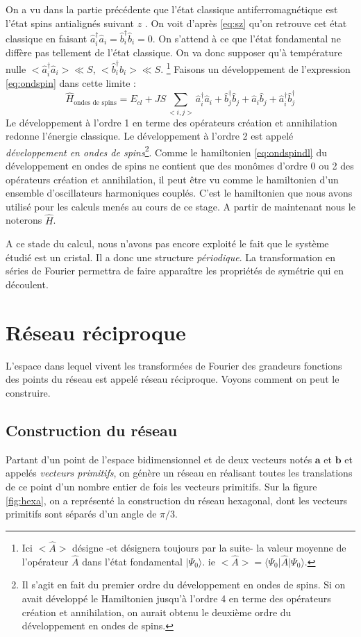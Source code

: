 \documentclass[a4paper, french]{report}
\newcommand{\bra}[1]{\ensuremath{\langle #1|}\xspace}
\newcommand{\an}{\hat{a}}
\newcommand{\cre}{\hat{a}^\dagger}
\newcommand{\h}{\ensuremath{\hat{H}}\xspace}
\newcommand{\ban}{\hat{b}}
\newcommand{\bcre}{\hat{b}^\dagger}
\newcommand{\fond}{\ensuremath{| \Psi_0 \rangle}\xspace}
\newcommand{\1}{\ensuremath{\ket{\om_1\bom_1}}\xspace}
\newcommand{\2}{\ensuremath{\ket{\om_2\bom_2}}\xspace}
\begin{document}
On a vu dans la partie précédente que l'état classique antiferromagnétique est l'état \og spins antialignés suivant $z$ \fg{}. On voit d'après \ref{eq:sz} qu'on retrouve cet état classique en faisant $\cre_i\an_i=\bcre_i\ban_i=0$. On s'attend à ce que l'état fondamental ne diffère pas tellement de l'état classique. On va donc supposer qu'à température nulle $<\cre_i\an_i>\ll S$, $<\bcre_i\ban_i>\ll S$. \footnote{Ici $<\hat A>$ désigne -et désignera toujours par la suite- la valeur moyenne de l'opérateur $\hat A$ dans l'état fondamental \fond. ie $<\hat A> = \bra{\Psi_0}\hat A \fond$.} Faisons un développement de l'expression \ref{eq:ondspin} dans cette limite :
\begin{equation}
\label{eq:ondspindl}
	\h_{\text{ondes de spins}}=E_{cl}+JS\sum_{<i,j>}\cre_i\an_i+\bcre_j\ban_j+\an_i\ban_j+\cre_i\bcre_j
\end{equation}
Le développement à l'ordre 1 en terme des opérateurs création et annihilation redonne l'énergie classique. Le développement à l'ordre 2 est appelé \emph{développement en ondes de spins}\footnote{Il s'agit en fait du premier ordre du développement en ondes de spins. Si on avait développé le Hamiltonien jusqu'à l'ordre 4 en terme des opérateurs création et annihilation, on aurait obtenu le deuxième ordre du développement en ondes de spins.}. Comme le hamiltonien \ref{eq:ondspindl} du développement en ondes de spins ne contient que des monômes d'ordre 0 ou 2 des opérateurs création et annihilation, il peut être vu comme le hamiltonien d'un ensemble d'oscillateurs harmoniques couplés. C'est le hamiltonien que nous avons utilisé pour les calculs menés au cours de ce stage. A partir de maintenant nous le noterons $\h$.

A ce stade du calcul, nous n'avons pas encore exploité le fait que le système étudié est un cristal. Il a donc une structure \emph{périodique}. La transformation en séries de Fourier permettra de faire apparaître les propriétés de symétrie qui en découlent.

\section{Réseau réciproque}

L'espace dans lequel vivent les transformées de Fourier des grandeurs fonctions des points du réseau est appelé réseau réciproque. Voyons comment on peut le construire.

\subsection{Construction du réseau}
Partant d'un point de l'espace bidimensionnel et de deux vecteurs notés $\mathbf{a}$ et $\mathbf{b}$ et appelés \emph{vecteurs primitifs}, on génère un réseau en réalisant toutes les translations de ce point d'un nombre entier de fois les vecteurs primitifs. Sur la figure \ref{fig:hexa}, on a représenté la construction du réseau hexagonal, dont les vecteurs primitifs sont séparés d'un angle de $\pi/3$.
\end{document}
